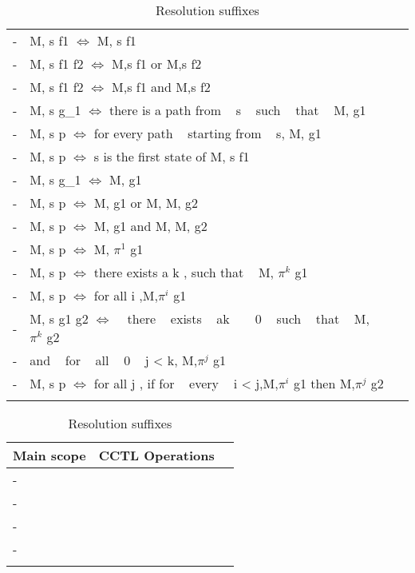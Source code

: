 \begin{longtable} { |s|p{10cm}|p{8cm}| }
	- &  M, s \models \not f1 $\Leftrightarrow$ M, s \nvdash f1 \\
	- & M, s \models f1 \vee f2 $\Leftrightarrow$ M,s \models f1 or M,s \nvdash f2 \\
	- &  M, s \models f1 \wedge f2 $\Leftrightarrow$  M,s \models f1 and M,s \nvdash f2 \\
	- &  M, s \models {} g_{1} $\Leftrightarrow$ there is a path \pi  from ~  s ~   such ~  that  ~ M, \pi \models g1 \\
	- &  M, s \models p $\Leftrightarrow$ for every path \pi  ~ starting from  ~  s, M, \pi \models g1 \\
	- & M, s \models p $\Leftrightarrow$ s is the first state of \piand M, s \models f1 \\
	- &  M, s \models \not g_{1} $\Leftrightarrow$ M, \pi  \nvdash g1 \\
	- & M, s \models p $\Leftrightarrow$  M, \pi  \models g1  or  M, \pi  M, \pi  \models g2 \\
	- &  M, s \models p $\Leftrightarrow$ M, \pi  \models g1  and  M, \pi  M, \pi  \models g2 \\
	- & M, s \models p $\Leftrightarrow$ M, $\pi^{1}$ \models g1 \\
	- &  M, s \models p $\Leftrightarrow$ there exists a k , such that  ~ M, $\pi^{k}$  \models g1 \\
	- & M, s \models p $\Leftrightarrow$ for all i ,M,$\pi^{i}$ \models g1 \\
	- &  M, s \models g1 \bugcup g2 $\Leftrightarrow$ ~  there  ~ exists  ~ ak  ~ \ge  ~ 0 ~  such ~  that  ~ M,  ~ $\pi^{k}$ \models g2 \\
	- & and  ~ for  ~ all ~  0  ~ \le j < k, M,$\pi^{j}$ \models g1 \\
	- &  M, s \models p $\Leftrightarrow$ for all j , if for ~  every  ~ i < j,M,$\pi^{i}$ \nvdash g1 then M,$\pi^{j}$ \models g2 \\
	\hline
	
	\caption{Resolution suffixes}
	\label{table:ressuffixes}
\end{longtable}

\begin{longtable} { |s|p{10cm}|p{8cm}| }
	\hline
	Main scope & CCTL Operations \\
	\hline
	- &  \\
	- &  \\
	- &  \\
	- &  \\
	\hline
	
	\caption{Resolution suffixes}
	\label{table:ressuffixes}
\end{longtable}

